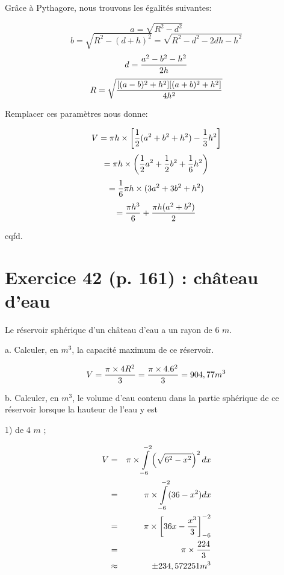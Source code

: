 \documentclass[10pt]{article}
\begin{document}
Grâce à Pythagore, nous trouvons les égalités suivantes:

$$a=\sqrt{R^2-d^2}$$
$$b=\sqrt{R^2-(d+h)^2} = \sqrt{R^2-d^2-2dh-h^2}$$
$$d={a^2-b^2-h^2\over{2h}}$$
$$R= \sqrt{{[(a-b)^2+h^2][(a+b)^2+h^2]\over{4h^2}}}$$\vspace{0.1cm}

Remplacer ces paramètres nous donne:

$$V = \pi h \times \left[{1\over{2}}(a^2+b^2+h^2)-{1\over{3}}h^2 \right]$$
$$= \pi h \times \left( {1\over{2}}a^2 + {1\over{2}}b^2 + {1\over{6}}h^2 \right)$$
$$={1\over{6}} \pi h \times (3a^2 + 3b^2 + h^2 )$$
$$={\pi h^3\over{6}} + {\pi h (a^2+b^2)\over{2}}$$

\begin{center}
cqfd.
\end{center}

\section*{Exercice 42 (p. 161) : château d'eau}\vspace{0.2cm}

\flushleft Le réservoir sphérique d'un château d'eau a un rayon de 6 $m$.\vspace{0.1cm}

a. Calculer, en $m^3$, la capacité maximum de ce réservoir.

$$V = {\pi \times 4R^2\over{3}} = {\pi \times 4.6^2\over{3}} = 904,77 m^3$$\vspace{0.1cm}

b. Calculer, en $m^3$, le volume d'eau contenu dans la partie sphérique de ce réservoir lorsque la hauteur de l'eau y est

\hspace{1cm}1) de 4 $m$ ;

\begin{eqnarray*}
V&=&\pi \times \int\limits_{-6}^{-2} \left( \sqrt{6^2-x^2} \right)^2dx\\
&=&\pi \times \int\limits_{-6}^{-2} (36-x^2)dx\\
&=&\pi \times \left[ 36x-{x^3\over{3}} \right]_{-6}^{-2}\\
&=&\pi \times \frac{224}{3}\\
&\approx&\pm 234,572251 m^3
\end{eqnarray*}

\newpage
\end{document}
